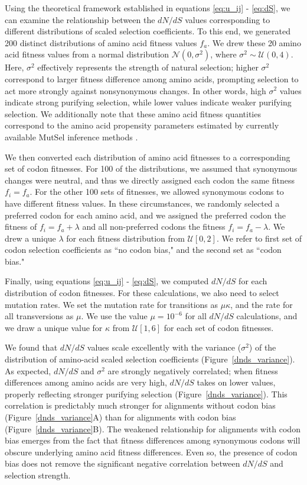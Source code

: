 \documentclass{pnastwo}
\begin{document}
\begin{article}
Using the theoretical framework established in equations \eqref{eq:u_ij} - \eqref{eq:dS}, we can examine the relationship between the $dN/dS$ values corresponding to different distributions of scaled selection coefficients. To this end, we generated 200 distinct distributions of amino acid fitness values $f_a$. We drew these 20 amino acid fitness values from a normal distribution $\mathcal{N}(0,\sigma^2)$, where $\sigma^2 \sim \mathcal{U}(0,4)$. Here, $\sigma^2$ effectively represents the strength of natural selection; higher $\sigma^2$ correspond to larger fitness difference among amino acids, prompting selection to act more strongly against nonsynonymous changes. In other words, high $\sigma^2$ values indicate strong purifying selection, while lower values indicate weaker purifying selection. We additionally note that these amino acid fitness quantities correspond to the amino acid propensity parameters estimated by currently available MutSel inference methods \cite{RodrigueLartillot2014,Tamurietal2014}.

We then converted each distribution of amino acid fitnesses to a corresponding set of codon fitnesses. For 100 of the distributions, we assumed that synonymous changes were neutral, and thus we directly assigned each codon the same fitness $f_i = f_a$. For the other 100 sets of fitnesses, we allowed synonymous codons to have different fitness values. In these circumstances, we randomly selected a preferred codon for each amino acid, and we assigned the preferred codon the fitness of $f_i = f_a + \lambda$ and all non-preferred codons the fitness $f_i = f_a - \lambda$. We drew a unique $\lambda$ for each fitness distribution from $\mathcal{U}[0,2]$. We refer to first set of codon selection coefficients as ``no codon bias," and the second set as ``codon bias." 

Finally, using equations \eqref{eq:u_ij} - \eqref{eq:dS}, we computed $dN/dS$ for each distribution of codon fitnesses. For these calculations, we also need to select mutation rates. We set the mutation rate for transitions as $\mu\kappa$, and the rate for all transversions as $\mu$. We use the value $\mu = 10^{-6}$ for all $dN/dS$ calculations, and we draw a unique value for $\kappa$ from $\mathcal{U}[1,6]$ for each set of codon fitnesses.

We found that $dN/dS$ values scale excellently with the variance ($\sigma^2$) of the distribution of amino-acid scaled selection coefficients (Figure~\ref{dnds_variance}). As expected, $dN/dS$ and $\sigma^2$ are strongly negatively correlated; when fitness differences among amino acids are very high, $dN/dS$ takes on lower values, properly reflecting stronger purifying selection (Figure~\ref{dnds_variance}). This correlation is predictably much stronger for alignments without codon bias (Figure~\ref{dnds_variance}A) than for alignments with codon bias (Figure~\ref{dnds_variance}B). The weakened relationship for alignments with codon bias emerges from the fact that fitness differences among synonymous codons will obscure underlying amino acid fitness differences. Even so, the presence of codon bias does not remove the significant negative correlation between $dN/dS$ and selection strength.
		

\end{article}
\end{document}
